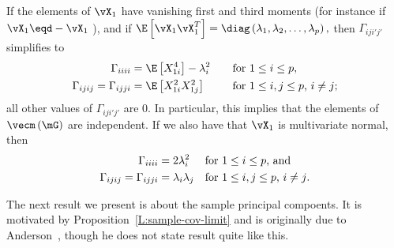 If the elements of $\vX_1$ have vanishing first and third moments (for instance if
\(
    \vX_1 \eqd - \vX_1
\)
), and if
\(
    \E \left[
        \vX_1 \vX_1^T
    \right]
    =
    \diag \left(
        \lambda_1,
        \lambda_2,
        \ldots,
        \lambda_p
    \right),
\)
then $\Gamma_{iji'j'}$ simplifies to
\begin{subequations}
\begin{align}
    \Gamma_{iiii} &= \E \left[ X_{1i}^4 \right] - \lambda_i^2 \quad 
                         &&\text{for $1 \leq i \leq p$}, \\
    \Gamma_{ijij} = \Gamma_{ijji} &= \E \left[ X_{1i}^2 X_{1j}^2 \right]
                         &&\text{for $ 1 \leq i,j \leq p$, $i \neq j$;}
\end{align}
\end{subequations}
all other values of $\Gamma_{iji'j'}$ are $0$.  In particular, this
implies that the elements of $\vecm \left( \mG \right)$ are independent.
If we also have that $\vX_1$ is multivariate normal, then 
\begin{subequations}
\begin{align}
    \Gamma_{iiii} &= 2 \lambda_i^2
                         &&\text{for $1 \leq i \leq p$, and} \\    
    \Gamma_{ijij} = \Gamma_{ijji} &= \lambda_i \lambda_j
                         &&\text{for $ 1 \leq i,j \leq p$, $i \neq j$.}
\end{align}
\end{subequations}

The next result we present is about the sample principal compoents.  It is motivated by Proposition~\ref{L:sample-cov-limit} and is originally due to Anderson~\cite{anderson1963atp}, though he does not state result quite like this.  

